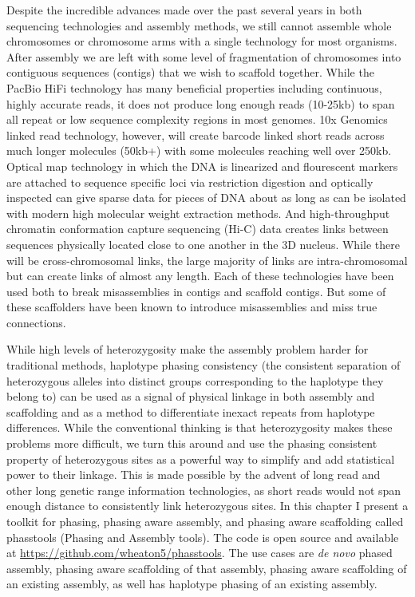 \par{
Despite the incredible advances made over the past several years in both sequencing technologies and assembly methods, we still cannot assemble whole chromosomes or chromosome arms with a 
single technology for most organisms. After assembly we are left with some level of fragmentation of chromosomes into contiguous sequences (contigs) that we wish to scaffold together. While the 
PacBio HiFi technology has many beneficial properties including continuous, highly accurate reads, it does not produce long enough reads (10-25kb) to span all repeat or low sequence complexity regions in most genomes.
 10x Genomics linked read technology, however, will create barcode linked short reads across much longer molecules (50kb+) with some molecules reaching well over 250kb\cite{10xlinked}. Optical map technology in which the DNA is linearized and flourescent markers are attached to sequence specific loci via restriction digestion and optically inspected can give sparse data for pieces of DNA about as long as can be isolated with modern high molecular weight extraction methods\cite{opticalmaps1}. And high-throughput chromatin conformation capture sequencing (Hi-C) data creates links between sequences physically located close to one another in the 3D nucleus. While there will be cross-chromosomal links, the large majority of links are intra-chromosomal but can create links of almost any length\cite{3CHIC}\cite{hic2}. Each of these technologies have been used both to break misassemblies in contigs and scaffold contigs\cite{scaff10x}\cite{opticalmaphuman}\cite{hicscafffirst}\cite{SALSA}\cite{GRAAL}\cite{instaGRAAL}. But some of these scaffolders have been known to introduce misassemblies and miss true connections\cite{hicscafffirst}. 
} 

\par{
While high levels of heterozygosity make the assembly problem harder for traditional methods, haplotype phasing consistency (the consistent separation of heterozygous alleles into distinct groups corresponding to the haplotype they belong to) can be used as a signal of physical linkage in both assembly and scaffolding and as a method to differentiate inexact repeats from haplotype differences. While the conventional thinking is that heterozygosity makes these problems more difficult, we turn this around and use the phasing consistent property of heterozygous sites as a powerful way to simplify and add statistical power to their linkage. This is made possible by the advent of long read and other long genetic range information technologies, as short reads would not span enough distance to consistently link heterozygous sites. In this chapter I present a toolkit for phasing, phasing aware assembly, and phasing aware scaffolding called phasstools (Phasing and Assembly tools). The code is open source and available at \href{https://github.com/wheaton5/phasstools}{https://github.com/wheaton5/phasstools}. The use cases are \textit{de novo} phased assembly, phasing aware scaffolding of that assembly, phasing aware scaffolding of an existing assembly, as well has haplotype phasing of an existing assembly.
}


